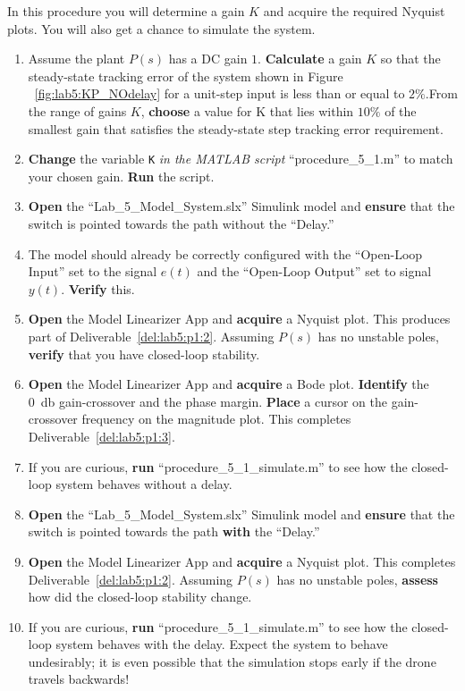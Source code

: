 \begin{procedure}[label={proc:lab5:1}]
  In this procedure you will determine a gain \(K\) and acquire the required Nyquist plots.
  You will also get a chance to simulate the system.
  \begin{enumerate}[label={(\arabic*)}]
    \item{%
      Assume the plant \(P(s)\) has a DC gain \(1.\)
      \textbf{Calculate} a gain \(K\) so that the steady-state tracking error of the system shown in Figure ~\ref{fig:lab5:KP_NOdelay} for a unit-step input is less than or equal to \(2\%.\)From the range of gains \(K\), \textbf{choose} a value for K that lies within \(10\%\) of the smallest gain that satisfies the steady-state step tracking error requirement.
    }
    \item{%
      \textbf{Change} the variable \texttt{K} \emph{in the MATLAB script} ``procedure\_5\_1.m'' to match your chosen gain.
      \textbf{Run} the script.
    }
    \item{%
      \textbf{Open} the ``Lab\_5\_Model\_System.slx'' Simulink model and \textbf{ensure} that the switch is pointed towards the path without the ``Delay.''
    }
    \item{%
      The model should already be correctly configured with the ``Open-Loop Input'' set to the signal \(e(t)\) and the ``Open-Loop Output'' set to signal \(y(t).\)
      \textbf{Verify} this.
    }
    \item{%
      \textbf{Open} the Model Linearizer App and \textbf{acquire} a Nyquist plot.
      This produces part of Deliverable~\ref{del:lab5:p1:2}.
      Assuming \(P(s)\) has no unstable poles, \textbf{verify} that you have closed-loop stability.
    }
    \item{%
      \textbf{Open} the Model Linearizer App and \textbf{acquire} a Bode plot.
      \textbf{Identify} the \SI{0}{\decibel} gain-crossover and the phase margin.
      \textbf{Place} a cursor on the gain-crossover frequency on the magnitude plot.
      This completes Deliverable~\ref{del:lab5:p1:3}.
    }
    \item{%
      If you are curious, \textbf{run} ``procedure\_5\_1\_simulate.m'' to see how the closed-loop system behaves without a delay.
    }
    \item{%
      \textbf{Open} the ``Lab\_5\_Model\_System.slx'' Simulink model and \textbf{ensure} that the switch is pointed towards the path \textbf{with} the ``Delay.''
    }
    \item{%
      \textbf{Open} the Model Linearizer App and \textbf{acquire} a Nyquist plot.
      This completes Deliverable~\ref{del:lab5:p1:2}.
      Assuming \(P(s)\) has no unstable poles, \textbf{assess} how did the closed-loop stability change.
    }
    \item{%
      If you are curious, \textbf{run} ``procedure\_5\_1\_simulate.m'' to see how the closed-loop system behaves with the delay.
      Expect the system to behave undesirably; it is even possible that the simulation stops early if the drone travels backwards!
    }
  \end{enumerate}
\end{procedure}

